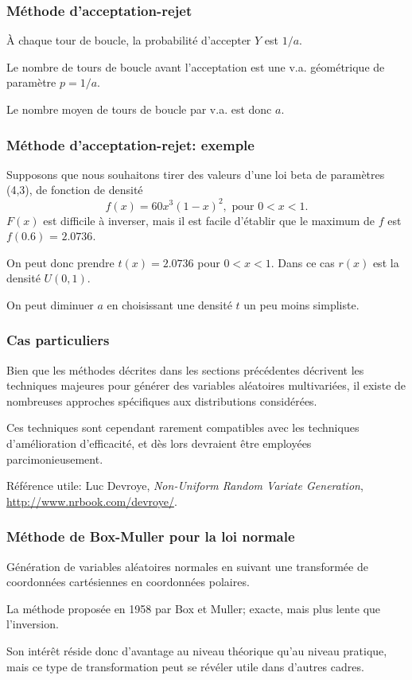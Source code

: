 \documentclass[t,usepdftitle=false]{beamer}
\begin{document}
\begin{frame}
\frametitle{Méthode d'acceptation-rejet}

\`A chaque tour de boucle, la probabilité d'accepter $Y$ est $1/a$.

\mbox{}

Le nombre de tours de boucle avant l'acceptation est une
v.a. géométrique de paramètre $p = 1/a$.

\mbox{}

Le nombre moyen de tours de boucle par v.a. est donc $a$.

\end{frame}

\begin{frame}
\frametitle{Méthode d'acceptation-rejet: exemple}

Supposons que nous souhaitons tirer des valeurs d'une loi beta de paramètres (4,3), de fonction de densité
\[
f(x) = 60x^3(1 - x)^2, \mbox{ pour } 0 < x < 1.
\]
$F (x)$ est difficile à inverser, mais il est facile d'établir que le maximum de $f$ est $f (0.6)$ = $2.0736$.

\mbox{}

On peut donc prendre $t(x) = 2.0736$ pour $0 < x < 1$.
Dans ce cas $r(x)$ est la densité $U (0, 1)$.

\mbox{}

On peut diminuer $a$ en choisissant une densité $t$ un peu moins
simpliste.

\end{frame}

\begin{frame}
\frametitle{Cas particuliers}

Bien que les méthodes décrites dans les sections précédentes décrivent les techniques majeures pour générer des variables aléatoires multivariées, il existe de nombreuses approches spécifiques aux distributions considérées.

\mbox{}

Ces techniques sont cependant rarement compatibles avec les techniques d'amélioration d'efficacité, et dès lors devraient être employées parcimonieusement.

\mbox{}

Référence utile: Luc Devroye,
\textsl{Non-Uniform Random Variate Generation}, 
\url{http://www.nrbook.com/devroye/}.

\end{frame}

\begin{frame}
\frametitle{Méthode de Box-Muller pour la loi normale}

Génération de variables aléatoires normales en suivant une transformée de coordonnées cartésiennes en coordonnées polaires.

\mbox{}

La méthode proposée en 1958 par Box et Muller; exacte, mais plus lente que l'inversion.

\mbox{}

Son intérêt réside donc d'avantage au niveau théorique qu'au niveau pratique, mais ce type de transformation peut se révéler utile dans d'autres cadres.

\end{frame}
\end{document}

